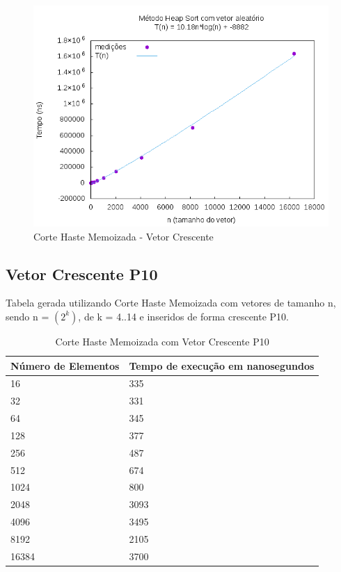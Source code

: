 \documentclass[12pt,a4paper,twoside]{report}
\begin{document}
\begin{figure}[H]
    \centering
    \includegraphics[width=0.7\linewidth]{graficos/HeapSort/vIntAleatorio/vIntAleatorio.png}
  \caption{Corte Haste Memoizada - Vetor Crescente}
\end{figure}

\subsection{Vetor Crescente P10}
Tabela gerada utilizando Corte Haste Memoizada com vetores de tamanho n, sendo n = $(2^k)$, de k = 4..14 e inseridos de forma crescente P10.
\begin{table}[H]
\centering
\caption{Corte Haste Memoizada com Vetor Crescente P10}
\label{my-label}
\begin{tabular}{|l|l|}
\hline
\multicolumn{1}{|c|}{\textbf{Número de Elementos}} & \multicolumn{1}{c|}{\textbf{Tempo de execução em nanosegundos}} \\ \hline
16 & 335 \\ \hline
32 & 331 \\ \hline
64 & 345 \\ \hline
128 & 377 \\ \hline
256 & 487 \\ \hline
512 & 674 \\ \hline
1024 & 800 \\ \hline
2048 & 3093 \\ \hline
4096 & 3495 \\ \hline
8192 & 2105 \\ \hline
16384 & 3700 \\ \hline
\end{tabular}
\end{table}
\end{document}
